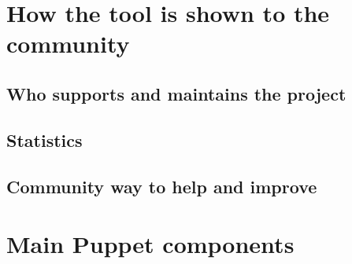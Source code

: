 \documentclass[12pt,a4paper,openright,twoside]{book}
\begin{document}
\section{How the tool is shown to the community}

\subsection{Who supports and maintains the project}

\subsection{Statistics}

\subsection{Community way to help and improve}

\section{Main Puppet components}



\end{document}
